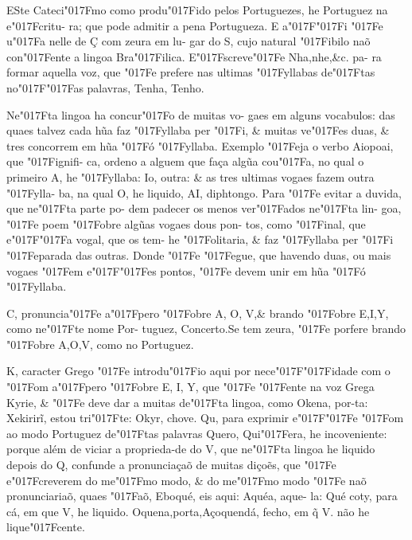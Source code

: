 \documentclass[openany,titlepage,12pt]{book}
\renewcommand{\chaptermark}[1]{\markboth{#1}{}}
\renewcommand{\sectionmark}[1]{\gdef\rightmark{#1}}
\newcommand{\lgS}{\char"017F}
\newcommand{\lgSS}{\char"017F\char"017F}
\begin{document}
\lettrine[findent=2pt, nindent=0pt, lines=2]
{E}{S}te Cateci\lgS mo como produ\lgS ido pelos\linebreak
Portuguezes, he Portuguez na e\lgS critu-
ra; que pode admitir a pena Portugueza.\linebreak
E a\lgSS i \lgS e u\lgS a nelle de Ç com zeura em lu-
gar do S, cujo natural \lgS ibilo naõ con\lgS ente a\linebreak
lingoa Bra\lgS ilica. E\lgS screve\lgS e Nha,nhe,\&c. pa-
ra formar aquella voz, que \lgS e prefere nas\linebreak
ultimas \lgS yllabas de\lgS tas no\lgSS as palavras,
Tenha, Tenho.

Ne\lgS ta lingoa ha concur\lgS o de muitas vo-
gaes em alguns vocabulos: das quaes talvez
cada hũa faz \lgS yllaba per \lgS i, \& muitas ve\lgS es
duas, \& tres concorrem em hũa \lgS ó \lgS yllaba.
Exemplo \lgS eja o verbo Aiopoai, que \lgS ignifi-
ca, ordeno a alguem que faça algũa cou\lgS a,
no qual o primeiro A, he \lgS yllaba: Io, outra:
\& as tres ultimas vogaes fazem outra \lgS ylla-
ba, na qual O, he liquido, AI, diphtongo.
Para \lgS e evitar a duvida, que ne\lgS ta parte po-
dem padecer os menos ver\lgS ados ne\lgS ta lin-
goa, \lgS e poem \lgS obre algũas vogaes dous pon-
tos, como \lgS inal, que e\lgSS a vogal, que os tem-
he \lgS olitaria, \& faz \lgS yllaba per \lgS i \lgS eparada das
outras. Donde \lgS e \lgS egue, que havendo duas,
ou mais vogaes \lgS em e\lgSS es pontos, \lgS e devem
unir em hũa \lgS ó \lgS yllaba.

\chaptermark{Advertencia.}
\sectionmark{Advertencia.}

C, pronuncia\lgS e a\lgS pero \lgS obre A, O, V,\&
brando \lgS obre E,I,Y, como ne\lgS te nome Por-
tuguez, Concerto.Se tem zeura, \lgS e porfere
brando \lgS obre A,O,V, como no Portuguez.

K, caracter Grego \lgS e introdu\lgS io aqui por
nece\lgSS idade com o \lgS om a\lgS pero \lgS obre E, I, Y, que
\lgS e \lgS ente na voz Grega Kyrie, \& \lgS e deve dar a muitas
de\lgS ta lingoa, como Okena, por-ta: Xekirirĩ, estou tri\lgS te:
Okyr, chove. Qu, para exprimir e\lgSS e \lgS om ao modo Portuguez
de\lgS tas palavras Quero, Qui\lgS era, he incoveniente: porque 
além de viciar a proprieda-de do V, que ne\lgS ta lingoa he liquido
depois do Q, confunde a pronunciaçaõ de muitas diçoẽs, que \lgS e
e\lgS creverem do me\lgS mo modo, \& do me\lgS mo modo \lgS e naõ
pronunciariaõ, quaes \lgS aõ, Eboqué, eis aqui: Aquéa, aque-
la: Qué coty, para cá, em que V, he liquido. Oquena,porta,Açoquendá,
fecho, em q̃ V. não he lique\lgS cente.
\end{document}

